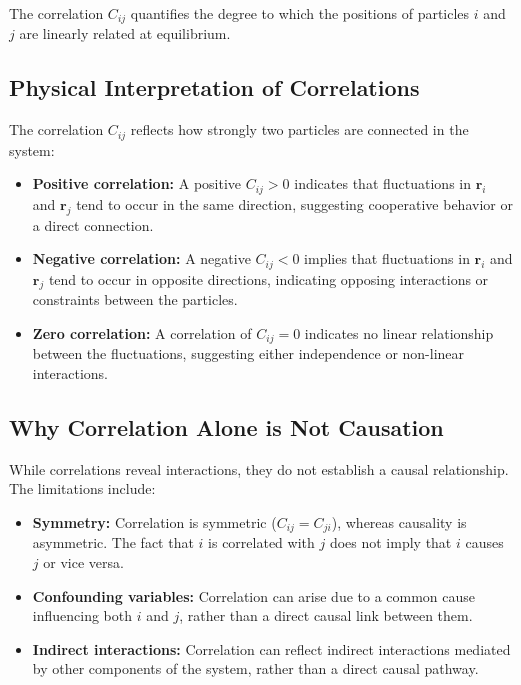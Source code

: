 \documentclass[English, Lau, oneside]{sapthesis}
\begin{document}
The correlation \( C_{ij} \) quantifies the degree to which the positions of particles \( i \) and \( j \) are linearly related at equilibrium.

\subsection*{Physical Interpretation of Correlations}

\noindent The correlation \( C_{ij} \) reflects how strongly two particles are connected in the system:
\begin{itemize}
    \item \textbf{Positive correlation:} A positive \( C_{ij} > 0 \) indicates that fluctuations in \( \mathbf{r}_i \) and \( \mathbf{r}_j \) tend to occur in the same direction, suggesting cooperative behavior or a direct connection.
    \item \textbf{Negative correlation:} A negative \( C_{ij} < 0 \) implies that fluctuations in \( \mathbf{r}_i \) and \( \mathbf{r}_j \) tend to occur in opposite directions, indicating opposing interactions or constraints between the particles.
    \item \textbf{Zero correlation:} A correlation of \( C_{ij} = 0 \) indicates no linear relationship between the fluctuations, suggesting either independence or non-linear interactions.
\end{itemize}

\subsection*{Why Correlation Alone is Not Causation}

\noindent While correlations reveal interactions, they do not establish a causal relationship. The limitations include:
\begin{itemize}
    \item \textbf{Symmetry:} Correlation is symmetric (\( C_{ij} = C_{ji} \)), whereas causality is asymmetric. The fact that \( i \) is correlated with \( j \) does not imply that \( i \) causes \( j \) or vice versa.
    \item \textbf{Confounding variables:} Correlation can arise due to a common cause influencing both \( i \) and \( j \), rather than a direct causal link between them.
    \item \textbf{Indirect interactions:} Correlation can reflect indirect interactions mediated by other components of the system, rather than a direct causal pathway.
\end{itemize}
\end{document}
